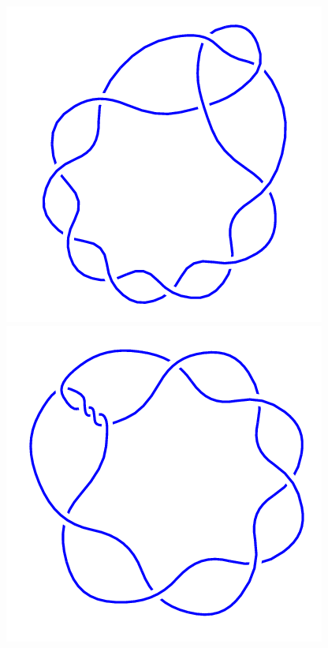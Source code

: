 \begin{figure}[H]
	\begin{minipage}[b]{.18\linewidth}
		\centering
		\includegraphics[width=\linewidth]{../data/10_2.png}
	\end{minipage}
	\begin{minipage}[b]{.18\linewidth}
		\centering
		\includegraphics[width=\linewidth]{../data/10_3.png}

\end{minipage}
\end{figure}
